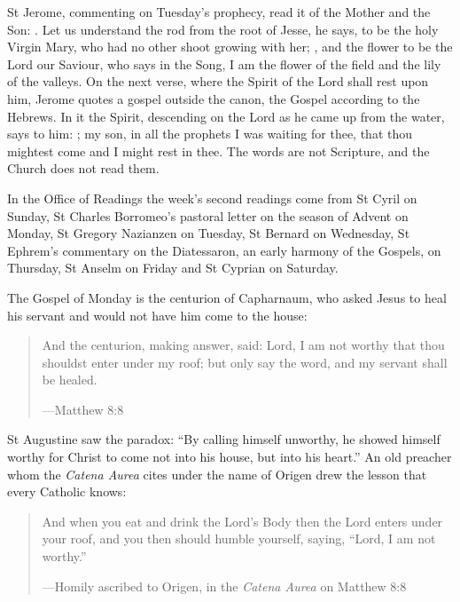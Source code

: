 St Jerome, commenting on Tuesday's prophecy, read it of the Mother and the
Son: . Let us understand the
rod from the root of Jesse, he says, to be the holy Virgin Mary, who had no
other shoot growing with her; , and the flower
to be the Lord our Saviour, who says in the Song, I am the flower of the field
and the lily of the valleys. On the next verse, where the Spirit of the Lord shall
rest upon him, Jerome quotes a gospel outside the canon, the Gospel
according to the Hebrews. In it the Spirit, descending on the Lord as he came up
from the water, says to him: ; my son, in all the prophets I was
waiting for thee, that thou mightest come and I might rest in thee. The words
are not Scripture, and the Church does not read them.

In the Office of Readings the
week's second readings come from St Cyril on Sunday, St Charles Borromeo's
pastoral letter on the season of Advent on Monday, St Gregory Nazianzen on
Tuesday, St Bernard on Wednesday, St Ephrem's commentary on the Diatessaron, an
early harmony of the Gospels, on Thursday, St Anselm on Friday and St Cyprian on Saturday.

The Gospel of Monday is the centurion of Capharnaum, who asked Jesus to heal his
servant and would not have him come to the house:

\begin{quote}
And the centurion, making answer, said: Lord, I am not worthy that thou shouldst
enter under my roof; but only say the word, and my servant shall be healed.\par
{\smallskip\noindent\small ---Matthew 8:8\par}
\end{quote}

\noindent St Augustine saw the paradox: ``By calling himself unworthy, he showed
himself worthy for Christ to come not into his house, but into his heart.'' An
old preacher whom the \emph{Catena Aurea} cites under the name of Origen drew the
lesson that every Catholic knows:

\begin{quote}
And when you eat and drink the Lord's Body then the Lord enters under your roof,
and you then should humble yourself, saying, ``Lord, I am not worthy.''\par
{\smallskip\noindent\small ---Homily ascribed to Origen, in the \emph{Catena Aurea} on Matthew 8:8\par}
\end{quote}

